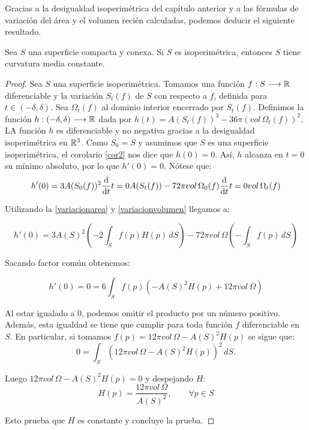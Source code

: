 Gracias a la desigualdad isoperimétrica del capítulo anterior y a las fórmulas de variación del área y el volumen recién calculadas, podemos deducir el siguiente resultado.

\begin{theorem}\label{meancurvaturecte}
Sea $S$ una superficie compacta y conexa. Si $S$ es isoperimétrica, entonces $S$ tiene curvatura media constante.
\end{theorem}
\begin{proof}
Sea $S$ una superficie isoperimétrica. Tomamos una función $f: S \longrightarrow \mathbb{R}$ diferenciable y la variación $S_t(f)$ de $S$ con respecto a $f$, definida para $t \in (-\delta, \delta)$. Sea $\Omega_t(f)$ al dominio interior encerrado por $S_t(f)$. Definimos la función $h: (-\delta, \delta) \longrightarrow \mathbb{R}$ dada por $h(t) = A(S_t(f))^3 - 36\pi(vol \, \Omega_t(f))^2$. LA función $h$ es diferenciable y no negativa gracias a la desigualdad isoperimétrica en $\mathbb{R}^3$. Como $S_0=S$ y asumimos que $S$ es una superficie isoperimétrica, el corolario \ref{cor2} nos dice que $h(0)=0$. Así, $h$ alcanza en $t=0$ su mínimo absoluto, por lo que $h'(0)=0$. Nótese que:
%
\begin{equation*}
    h'(0) = 3A(S_0(f))^2 \diff{}{t}{t=0} A(S_t(f)) - 72\pi vol \, \Omega_0(f) \diff{}{t}{t=0} vol \, \Omega_t(f)
\end{equation*}

Utilizando la \autoref{variacionarea} y \autoref{variacionvolumen} llegamos a:

\begin{equation*}
    h'(0) = 3A(S)^2 \left( -2 \int_S f(p)H(p) \, dS \right) - 72\pi vol \, \Omega \left( - \int_S f(p) \, dS \right)
\end{equation*}

Sacando factor común obtenemos:

\begin{equation*}
    h'(0) = 0 = 6 \int_S f(p)(-A(S)^2H(p) + 12 \pi vol \, \Omega)
\end{equation*}

Al estar igualado a $0$, podemos omitir el producto por un número positivo. Además, esta igualdad se tiene que cumplir para toda función $f$ diferenciable en $S$. En particular, si tomamos $f(p) = 12 \pi vol \, \Omega - A(S)^2H(p)$ se sigue que:
%
\begin{equation*}
    0 = \int_S \left( 12 \pi vol \, \Omega - A(S)^2H(p) \right)^2 \, dS.
\end{equation*}

Luego $12 \pi vol \, \Omega - A(S)^2H(p) = 0$ y despejando $H$:
%
\begin{equation*}
    H(p) = \frac{12 \pi vol \, \Omega}{A(S)^2}, \qquad \forall p \in S
\end{equation*}

Esto prueba que $H$ es constante y concluye la prueba.
\end{proof}


